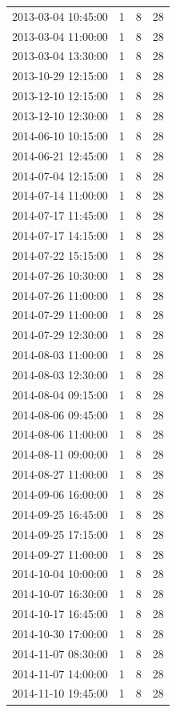 \begin{tabular}{lrrr}
2013-03-04 10:45:00 & 1 & 8 & 28 \\
2013-03-04 11:00:00 & 1 & 8 & 28 \\
2013-03-04 13:30:00 & 1 & 8 & 28 \\
2013-10-29 12:15:00 & 1 & 8 & 28 \\
2013-12-10 12:15:00 & 1 & 8 & 28 \\
2013-12-10 12:30:00 & 1 & 8 & 28 \\
2014-06-10 10:15:00 & 1 & 8 & 28 \\
2014-06-21 12:45:00 & 1 & 8 & 28 \\
2014-07-04 12:15:00 & 1 & 8 & 28 \\
2014-07-14 11:00:00 & 1 & 8 & 28 \\
2014-07-17 11:45:00 & 1 & 8 & 28 \\
2014-07-17 14:15:00 & 1 & 8 & 28 \\
2014-07-22 15:15:00 & 1 & 8 & 28 \\
2014-07-26 10:30:00 & 1 & 8 & 28 \\
2014-07-26 11:00:00 & 1 & 8 & 28 \\
2014-07-29 11:00:00 & 1 & 8 & 28 \\
2014-07-29 12:30:00 & 1 & 8 & 28 \\
2014-08-03 11:00:00 & 1 & 8 & 28 \\
2014-08-03 12:30:00 & 1 & 8 & 28 \\
2014-08-04 09:15:00 & 1 & 8 & 28 \\
2014-08-06 09:45:00 & 1 & 8 & 28 \\
2014-08-06 11:00:00 & 1 & 8 & 28 \\
2014-08-11 09:00:00 & 1 & 8 & 28 \\
2014-08-27 11:00:00 & 1 & 8 & 28 \\
2014-09-06 16:00:00 & 1 & 8 & 28 \\
2014-09-25 16:45:00 & 1 & 8 & 28 \\
2014-09-25 17:15:00 & 1 & 8 & 28 \\
2014-09-27 11:00:00 & 1 & 8 & 28 \\
2014-10-04 10:00:00 & 1 & 8 & 28 \\
2014-10-07 16:30:00 & 1 & 8 & 28 \\
2014-10-17 16:45:00 & 1 & 8 & 28 \\
2014-10-30 17:00:00 & 1 & 8 & 28 \\
2014-11-07 08:30:00 & 1 & 8 & 28 \\
2014-11-07 14:00:00 & 1 & 8 & 28 \\
2014-11-10 19:45:00 & 1 & 8 & 28 \\

\end{tabular}
